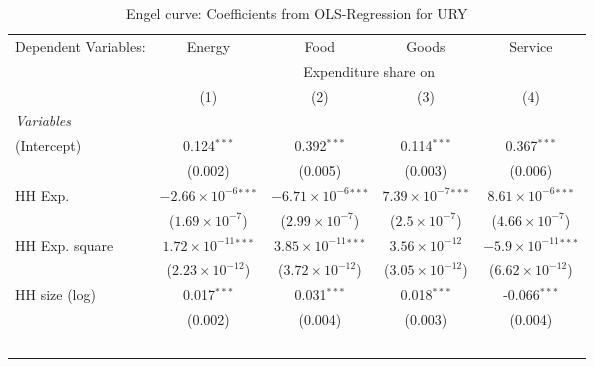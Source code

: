
\begin{table}[htbp!]
   \centering
   \small
   \begin{adjustbox}{width = 1\textwidth, max height = 0.95\textheight, center}
      \begin{threeparttable}[b]
         \caption{\label{tab:Engel_parametric_URY} Engel curve: Coefficients from OLS-Regression for URY}
         \begin{tabular}{lcccc}
            \tabularnewline \midrule \midrule
            Dependent Variables: & Energy                         & Food                           & Goods                         & Service\\  
             & \multicolumn{4}{c}{Expenditure share on} \\ 
                                 & (1)                            & (2)                            & (3)                           & (4)\\  
            \midrule
            \emph{Variables}\\
            (Intercept)          & 0.124$^{***}$                  & 0.392$^{***}$                  & 0.114$^{***}$                 & 0.367$^{***}$\\   
                                 & (0.002)                        & (0.005)                        & (0.003)                       & (0.006)\\   
            HH Exp.              & $-2.66\times 10^{-6}$$^{***}$  & $-6.71\times 10^{-6}$$^{***}$  & $7.39\times 10^{-7}$$^{***}$  & $8.61\times 10^{-6}$$^{***}$\\    
                                 & ($1.69\times 10^{-7}$)         & ($2.99\times 10^{-7}$)         & ($2.5\times 10^{-7}$)         & ($4.66\times 10^{-7}$)\\    
            HH Exp. square       & $1.72\times 10^{-11}$$^{***}$  & $3.85\times 10^{-11}$$^{***}$  & $3.56\times 10^{-12}$         & $-5.9\times 10^{-11}$$^{***}$\\    
                                 & ($2.23\times 10^{-12}$)        & ($3.72\times 10^{-12}$)        & ($3.05\times 10^{-12}$)       & ($6.62\times 10^{-12}$)\\    
            HH size (log)        & 0.017$^{***}$                  & 0.031$^{***}$                  & 0.018$^{***}$                 & -0.066$^{***}$\\   
                                 & (0.002)                        & (0.004)                        & (0.003)                       & (0.004)\\   
$$
\end{tabular}
\end{threeparttable}
\end{adjustbox}
\end{table}

